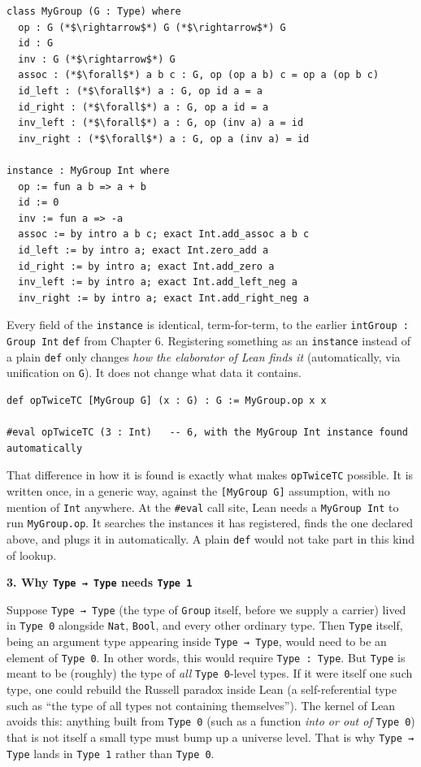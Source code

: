 \begin{lstlisting}
class MyGroup (G : Type) where
  op : G (*$\rightarrow$*) G (*$\rightarrow$*) G
  id : G
  inv : G (*$\rightarrow$*) G
  assoc : (*$\forall$*) a b c : G, op (op a b) c = op a (op b c)
  id_left : (*$\forall$*) a : G, op id a = a
  id_right : (*$\forall$*) a : G, op a id = a
  inv_left : (*$\forall$*) a : G, op (inv a) a = id
  inv_right : (*$\forall$*) a : G, op a (inv a) = id

instance : MyGroup Int where
  op := fun a b => a + b
  id := 0
  inv := fun a => -a
  assoc := by intro a b c; exact Int.add_assoc a b c
  id_left := by intro a; exact Int.zero_add a
  id_right := by intro a; exact Int.add_zero a
  inv_left := by intro a; exact Int.add_left_neg a
  inv_right := by intro a; exact Int.add_right_neg a
\end{lstlisting}

Every field of the \texttt{instance} is identical, term-for-term, to the earlier \texttt{intGroup : Group Int} \texttt{def} from Chapter 6. Registering something as an \texttt{instance} instead of a plain \texttt{def} only changes \emph{how the elaborator of Lean finds it} (automatically, via unification on \texttt{G}). It does not change what data it contains.

\begin{lstlisting}
def opTwiceTC [MyGroup G] (x : G) : G := MyGroup.op x x

#eval opTwiceTC (3 : Int)   -- 6, with the MyGroup Int instance found automatically
\end{lstlisting}

That difference in how it is found is exactly what makes \texttt{opTwiceTC} possible. It is written once, in a generic way, against the \texttt{[MyGroup G]} assumption, with no mention of \texttt{Int} anywhere. At the \texttt{\#eval} call site, Lean needs a \texttt{MyGroup Int} to run \texttt{MyGroup.op}. It searches the instances it has registered, finds the one declared above, and plugs it in automatically. A plain \texttt{def} would not take part in this kind of lookup.

\textbf{3. Why \texttt{Type → Type} needs \texttt{Type 1}}

Suppose \texttt{Type → Type} (the type of \texttt{Group} itself, before we supply a carrier) lived in \texttt{Type 0} alongside \texttt{Nat}, \texttt{Bool}, and every other ordinary type. Then \texttt{Type} itself, being an argument type appearing inside \texttt{Type → Type}, would need to be an element of \texttt{Type 0}. In other words, this would require \texttt{Type : Type}. But \texttt{Type} is meant to be (roughly) the type of \emph{all} \texttt{Type 0}-level types. If it were itself one such type, one could rebuild the Russell paradox inside Lean (a self-referential type such as ``the type of all types not containing themselves''). The kernel of Lean avoids this: anything built from \texttt{Type 0} (such as a function \emph{into or out of} \texttt{Type 0}) that is not itself a small type must bump up a universe level. That is why \texttt{Type → Type} lands in \texttt{Type 1} rather than \texttt{Type 0}.


